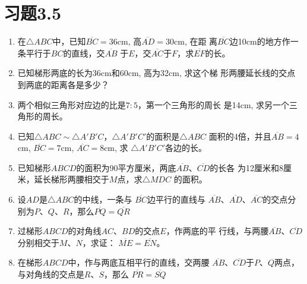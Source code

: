 \section*{习题3.5}
\begin{enumerate}
    \item 在$\triangle ABC$中，已知$\overline{BC}=36$cm, 高$\overline{AD}=30$cm, 在距
    离$\overline{BC}$边10cm的地方作一条平行于$BC$的直线，交$\overline{AB}$
    于$E$，交$\overline{AC}$于$F$，求$\overline{EF}$的长。
    \item 已知梯形两底的长为36cm和60cm, 高为32cm, 求这个梯
    形两腰延长线的交点到两底的距离各是多少？
    \item 两个相似三角形对应边的比是$7:5$，第一个三角形的周长
    是14cm, 求另一个三角形的周长。
    \item 已知$\triangle ABC\sim \triangle A'B'C$，$\triangle A'B'C'$的面积是$\triangle ABC$
    面积的4倍，并且$\overline{AB}=4$cm, $\overline{BC}=7$cm, $\overline{AC}=8$cm, 求
    $\triangle A'B'C'$各边的长。
    \item 已知梯形$ABCD$的面积为90平方厘米，两底$\overline{AB}$、$\overline{CD}$的长各
    为12厘米和8厘米，延长梯形两腰相交于$M$点，求$\triangle MDC$
    的面积。
    \item 设$AD$是$\triangle ABC$的中线，一条与
    $\overline{BC}$边平行的直线与
    $\overline{AB}$、$\overline{AD}$、$\overline{AC}$的交点分别为$P$、$Q$、$R$，那么$\overline{PQ}=\overline{QR}$
    \item 过梯形$ABCD$的对角线$AC$、$BD$的交点$E$，作两底的平
    行线，与两腰$\overline{AB}$、$\overline{CD}$分别相交于$M$、$N$，求证：
    $\overline{ME}=\overline{EN}$。
    \item 在梯形$ABCD$中，作与两底互相平行的直线，交两腰
    $\overline{AB}$、$\overline{CD}$于$P$、$Q$两点，与对角线的交点是$R$、$S$，那么
    $\overline{PR}=\overline{SQ}$
\end{enumerate}

